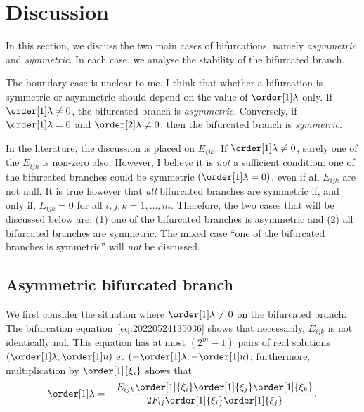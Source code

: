 \section{Discussion}

In this section, we discuss the two main cases of bifurcations, namely \emph{asymmetric} and \emph{symmetric}. In each
case, we analyse the stability of the bifurcated branch.

\begin{remark}
  The boundary case is unclear to me. I think that whether a bifurcation is symmetric or asymmetric should depend on the
  value of $\order[1]\lambda$ only. If $\order[1]\lambda \neq 0$, the bifurcated branch is
  \emph{asymmetric}. Conversely, if $\order[1]\lambda = 0$ and $\order[2]\lambda \neq 0$, then the bifurcated branch is
  \emph{symmetric}.

  In the literature, the discussion is placed on $E_{ijk}$. If $\order[1]\lambda \neq 0$, surely one of the $E_{ijk}$ is
  non-zero also. However, I believe it is \emph{not} a sufficient condition: one of the bifurcated branches could be
  symmetric $(\order[1]\lambda = 0)$, even if all $E_{ijk}$ are not null. It is true however that \emph{all} bifurcated
  branches are symmetric if, and only if, $E_{ijk}=0$ for all $i, j, k = 1, \ldots, m$. Therefore, the two cases that
  will be discussed below are: (1) one of the bifurcated branches is asymmetric and (2) all bifurcated branches are
  symmetric. The mixed case ``one of the bifurcated branches is symmetric'' will \emph{not} be discussed.
\end{remark}

\subsection{Asymmetric bifurcated branch}

We first consider the situation where $\order[1]\lambda \neq 0$ on the bifurcated branch. The bifurcation
equation~\eqref{eq:20220524135036} shows that necessarily, $E_{ijk}$ is not identically nul. This equation has at most
$(2^m - 1)$ pairs of real solutions $(\order[1]\lambda, \order[1]u)$ et $(- \order[1]\lambda, - \order[1]u)$;
furthermore, multiplication by $\order[1]{\xi_i}$ shows that
\begin{equation}
  \label{eq:20220801085236}
  \order[1]\lambda = -\frac{E_{ijk} \order[1]{\xi_i} \order[1]{\xi_j} \order[1]{\xi_k}}{2 F_{ij} \order[1]{\xi_i} \order[1]{\xi_j}}.
\end{equation}

